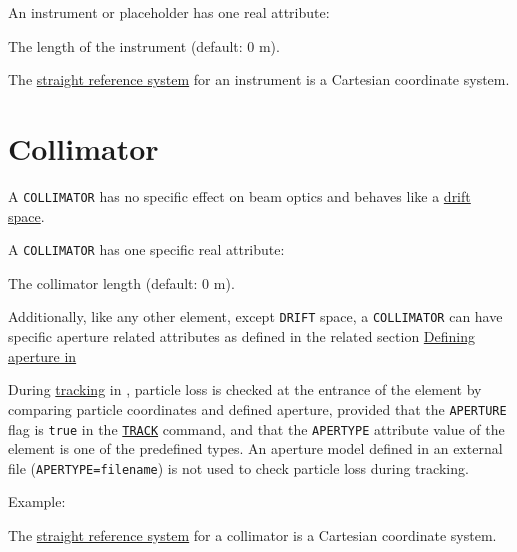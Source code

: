 {

An instrument or placeholder has one real attribute: 
\begin{madlist}
    The length of the instrument (default: 0 m). 
\end{madlist}

The \hyperref[subsec:local_straight]{straight reference system} for an 
instrument is a Cartesian coordinate system.  


\section{Collimator}
\label{sec:collimator}

A {\tt COLLIMATOR} has no specific effect on beam optics and behaves like a
\hyperref[sec:drift]{drift space}. 


A {\tt COLLIMATOR} has one specific real attribute: 
\begin{madlist}
	 The collimator length (default: 0 m). 
\end{madlist}

Additionally, like any other element, except {\tt DRIFT} space, 
a {\tt COLLIMATOR} can have specific aperture related attributes 
as defined in the related section \hyperref[sec:def_aper]{Defining 
aperture in \madx}

During \hyperref[chap:thin_track]{tracking} in \madx, particle loss 
is checked at the entrance of the element by comparing particle coordinates 
and defined aperture, provided that the {\tt APERTURE} flag is {\tt true} 
in the \hyperref[sec:track]{\tt TRACK} command, 
and that the {\tt APERTYPE} attribute value of the element is one of the 
predefined types. 
An aperture model defined in an external file ({\tt APERTYPE=filename})
is not used to check particle loss during tracking. 

Example: 

The \hyperref[subsec:local_straight]{straight reference system} for a
collimator is a Cartesian coordinate system.  

}
